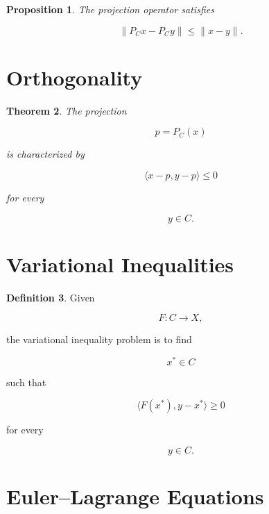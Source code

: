 \documentclass[11pt]{book}
\numberwithin{equation}{chapter}
\theoremstyle{definition}
\newtheorem{definition}{Definition}[chapter]
\theoremstyle{plain}
\newtheorem{theorem}[definition]{Theorem}
\newtheorem{proposition}[definition]{Proposition}
\begin{document}

\begin{proposition}

The projection operator satisfies

\[
\|P_Cx-P_Cy\|
\le
\|x-y\|.
\]

\end{proposition}


\section{Orthogonality}

\begin{theorem}

The projection

\[
p=P_C(x)
\]

is characterized by

\[
\langle
x-p,
y-p
\rangle
\le
0
\]

for every

\[
y\in C.
\]

\end{theorem}


\section{Variational Inequalities}

\begin{definition}

Given

\[
F:C\rightarrow X,
\]

the variational inequality problem is to find

\[
x^*
\in C
\]

such that

\[
\langle
F(x^*),
y-x^*
\rangle
\ge
0
\]

for every

\[
y\in C.
\]

\end{definition}


\section{Euler--Lagrange Equations}
\end{document}
